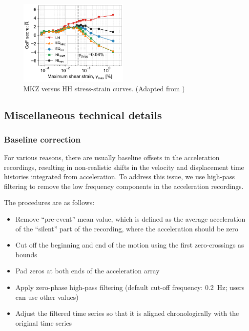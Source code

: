 \documentclass[11pt,letterpaper]{article}
\begin{document}
\begin{figure}[H]
    \centering
    \includegraphics[width=0.48\textwidth]{Figure_14a_Average_GoF_score_vs_max_strain_9_stations_5_methods__a414a.pdf}
    \caption{MKZ versus HH stress-strain curves. (Adapted from \citealp{Shi_Asimaki_2017})}
    \label{fig:GoF_score_vs_max_strain}
\end{figure}


\newpage
\subsection{Miscellaneous technical details}

\subsubsection{Baseline correction}\label{sec:baseline-correction}

For various reasons, there are usually baseline offsets in the acceleration recordings, resulting in non-realistic shifts in the velocity and displacement time histories integrated from acceleration. To address this issue, we use high-pass filtering to remove the low frequency components in the acceleration recordings.

The procedures are as follows:
\begin{itemize}
	\item Remove ``pre-event'' mean value, which is defined as the average acceleration of the ``silent'' part 
	           of the recording, where the acceleration should be zero
	\item Cut off the beginning and end of the motion using the first zero-crossings as bounds
	\item Pad zeros at both ends of the acceleration array
	\item Apply zero-phase high-pass filtering (default cut-off frequency: 0.2~Hz; users can use other values)
	\item Adjust the filtered time series so that it is aligned chronologically with the original time series
\end{itemize}
\end{document}
